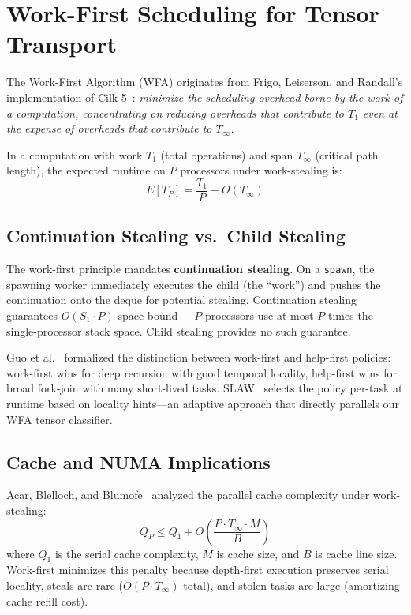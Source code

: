 \documentclass[11pt,letterpaper]{article}
\theoremstyle{definition}
\begin{document}
\section{Work-First Scheduling for Tensor Transport}
\label{sec:work-first}

The Work-First Algorithm (WFA) originates from Frigo, Leiserson, and Randall's implementation of Cilk-5~\cite{frigo1998cilk5}: \emph{minimize the scheduling overhead borne by the work of a computation, concentrating on reducing overheads that contribute to $T_1$ even at the expense of overheads that contribute to $T_\infty$.}

In a computation with work $T_1$ (total operations) and span $T_\infty$ (critical path length), the expected runtime on $P$ processors under work-stealing is:
\begin{equation}
    E[T_P] = \frac{T_1}{P} + O(T_\infty)
    \label{eq:workstealing}
\end{equation}

\subsection{Continuation Stealing vs.\ Child Stealing}

The work-first principle mandates \textbf{continuation stealing}. On a \texttt{spawn}, the spawning worker immediately executes the child (the ``work'') and pushes the continuation onto the deque for potential stealing. Continuation stealing guarantees $O(S_1 \cdot P)$ space bound~\cite{blumofe1999workstealing}---$P$ processors use at most $P$ times the single-processor stack space. Child stealing provides no such guarantee.

Guo et al.~\cite{guo2009workfirst} formalized the distinction between work-first and help-first policies: work-first wins for deep recursion with good temporal locality, help-first wins for broad fork-join with many short-lived tasks. SLAW~\cite{guo2010slaw} selects the policy per-task at runtime based on locality hints---an adaptive approach that directly parallels our WFA tensor classifier.

\subsection{Cache and NUMA Implications}

Acar, Blelloch, and Blumofe~\cite{acar2002locality} analyzed the parallel cache complexity under work-stealing:
\begin{equation}
    Q_P \leq Q_1 + O\!\left(\frac{P \cdot T_\infty \cdot M}{B}\right)
    \label{eq:cachemiss}
\end{equation}
where $Q_1$ is the serial cache complexity, $M$ is cache size, and $B$ is cache line size. Work-first minimizes this penalty because depth-first execution preserves serial locality, steals are rare ($O(P \cdot T_\infty)$ total), and stolen tasks are large (amortizing cache refill cost).
\end{document}
